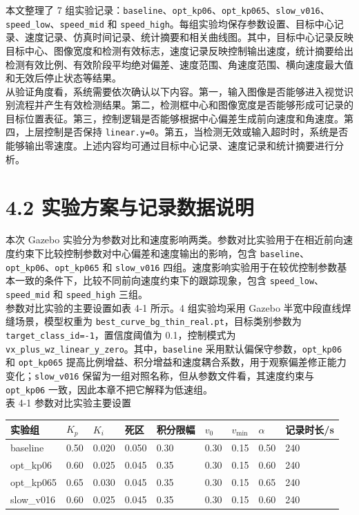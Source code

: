 \documentclass[UTF8,a4paper,12pt]{ctexrep}
\begin{document}
本文整理了 7 组实验记录：\texttt{baseline}、\texttt{opt\_kp06}、\texttt{opt\_kp065}、\texttt{slow\_v016}、\texttt{speed\_low}、\texttt{speed\_mid} 和 \texttt{speed\_high}。每组实验均保存参数设置、目标中心记录、速度记录、仿真时间记录、统计摘要和相关曲线图。其中，目标中心记录反映目标中心、图像宽度和检测有效标志，速度记录反映控制输出速度，统计摘要给出检测有效比例、有效阶段平均绝对偏差、速度范围、角速度范围、横向速度最大值和无效后停止状态等结果。\\

从验证角度看，系统需要依次确认以下内容。第一，输入图像是否能够进入视觉识别流程并产生有效检测结果。第二，检测框中心和图像宽度是否能够形成可记录的目标位置表征。第三，控制逻辑是否能够根据中心偏差生成前向速度和角速度。第四，上层控制是否保持 \texttt{linear.y=0}。第五，当检测无效或输入超时时，系统是否能够输出零速度。上述内容均可通过目标中心记录、速度记录和统计摘要进行分析。\\

\section{4.2 实验方案与记录数据说明}

本次 Gazebo 实验分为参数对比和速度影响两类。参数对比实验用于在相近前向速度约束下比较控制参数对中心偏差和速度输出的影响，包含 \texttt{baseline}、\texttt{opt\_kp06}、\texttt{opt\_kp065} 和 \texttt{slow\_v016} 四组。速度影响实验用于在较优控制参数基本一致的条件下，比较不同前向速度约束下的跟踪现象，包含 \texttt{speed\_low}、\texttt{speed\_mid} 和 \texttt{speed\_high} 三组。\\

参数对比实验的主要设置如表 4-1 所示。4 组实验均采用 Gazebo 半宽中段直线焊缝场景，模型权重为 \texttt{best\_curve\_bg\_thin\_real.pt}，目标类别参数为 \texttt{target\_class\_id=-1}，置信度阈值为 0.1，控制模式为 \texttt{vx\_plus\_wz\_linear\_y\_zero}。其中，\texttt{baseline} 采用默认偏保守参数，\texttt{opt\_kp06} 和 \texttt{opt\_kp065} 提高比例增益、积分增益和速度耦合系数，用于观察偏差修正能力变化；\texttt{slow\_v016} 保留为一组对照名称，但从参数文件看，其速度约束与 \texttt{opt\_kp06} 一致，因此本章不把它解释为低速组。\\

表 4-1 参数对比实验主要设置\\

\begin{longtable}{|p{}|p{}|p{}|p{}|p{}|p{}|p{}|p{}|p{}|}
\hline
实验组 & $K_p$ & $K_i$ & 死区 & 积分限幅 & $v_0$ & $v_{\min}$ & $\alpha$ & 记录时长/s \\ \hline
baseline & 0.50 & 0.020 & 0.050 & 0.30 & 0.30 & 0.15 & 0.50 & 240 \\ \hline
opt\_kp06 & 0.60 & 0.025 & 0.045 & 0.35 & 0.30 & 0.15 & 0.60 & 240 \\ \hline
opt\_kp065 & 0.65 & 0.030 & 0.045 & 0.35 & 0.30 & 0.15 & 0.65 & 240 \\ \hline
slow\_v016 & 0.60 & 0.025 & 0.045 & 0.35 & 0.30 & 0.15 & 0.60 & 240 \\ \hline
\end{longtable}
\end{document}
